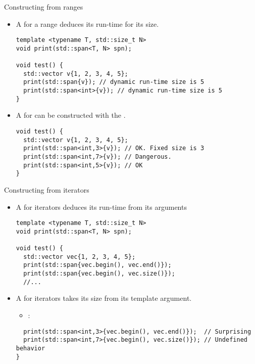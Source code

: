 \begin{frame}[t,fragile]{Constructing from ranges}
\begin{itemize}
  \item A   for a range
        deduces its run-time  for its size.
\begin{lstlisting}
template <typename T, std::size_t N>
void print(std::span<T, N> spn);

void test() {
  std::vector v{1, 2, 3, 4, 5};
  print(std::span{v}); // dynamic run-time size is 5
  print(std::span<int>{v}); // dynamic run-time size is 5
}
\end{lstlisting}

  \item A   for 
        can be constructed with the .
\begin{lstlisting}
void test() {
  std::vector v{1, 2, 3, 4, 5};
  print(std::span<int,3>{v}); // OK. Fixed size is 3
  print(std::span<int,7>{v}); // Dangerous.
  print(std::span<int,5>{v}); // OK
}
\end{lstlisting}
\end{itemize}
\end{frame}

\begin{frame}[t,fragile]{Constructing from iterators}
\begin{itemize}
  \item A   for iterators
        deduces its run-time  from its arguments
\begin{lstlisting}
template <typename T, std::size_t N>
void print(std::span<T, N> spn);

void test() {
  std::vector vec{1, 2, 3, 4, 5};
  print(std::span{vec.begin(), vec.end()});
  print(std::span{vec.begin(), vec.size()});
  //...
\end{lstlisting}

  \item A   for iterators
        takes its size from its template argument.
    \begin{itemize}
      \item {}: 
    \end{itemize}
\begin{lstlisting}
  print(std::span<int,3>{vec.begin(), vec.end()});  // Surprising
  print(std::span<int,7>{vec.begin(), vec.size()}); // Undefined behavior
}
\end{lstlisting}

\end{itemize}
\end{frame}
